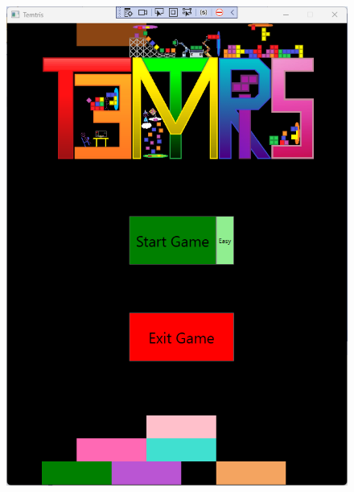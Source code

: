 \documentclass[10pt,conference,onecolumn,compsoc]{IEEEtran}
\begin{document}
\begin{figure}[!h]
\includegraphics[scale=0.3]{Temtris_Menu.png}

\end{figure}
\end{document}
